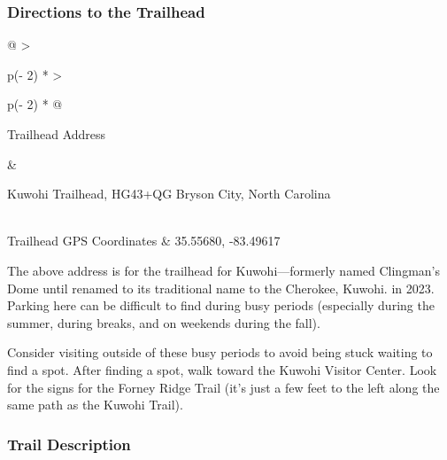 \documentclass[
  letterpaper,
  DIV=11,
  numbers=noendperiod]{scrartcl}
\begin{document}
\hypertarget{directions-to-the-trailhead-28}{%
\subsubsection{Directions to the
Trailhead}\label{directions-to-the-trailhead-28}}

\begin{longtable}[]{@{}
  >{\raggedright\arraybackslash}p{(\columnwidth - 2\tabcolsep) * }
  >{\raggedright\arraybackslash}p{(\columnwidth - 2\tabcolsep) * }@{}}
\toprule\noalign{}
\begin{minipage}[b]{\linewidth}\raggedright
Trailhead Address
\end{minipage} & \begin{minipage}[b]{\linewidth}\raggedright
Kuwohi Trailhead, HG43+QG Bryson City, North Carolina
\end{minipage} \\
\midrule\noalign{}
\endhead
\bottomrule\noalign{}
\endlastfoot
Trailhead GPS Coordinates & 35.55680, -83.49617 \\
\end{longtable}

The above address is for the trailhead for Kuwohi---formerly named
Clingman's Dome until renamed to its traditional name to the Cherokee,
Kuwohi. in 2023. Parking here can be difficult to find during busy
periods (especially during the summer, during breaks, and on weekends
during the fall).

Consider visiting outside of these busy periods to avoid being stuck
waiting to find a spot. After finding a spot, walk toward the Kuwohi
Visitor Center. Look for the signs for the Forney Ridge Trail (it's just
a few feet to the left along the same path as the Kuwohi Trail).

\hypertarget{trail-description-28}{%
\subsubsection{Trail Description}\label{trail-description-28}}
\end{document}
